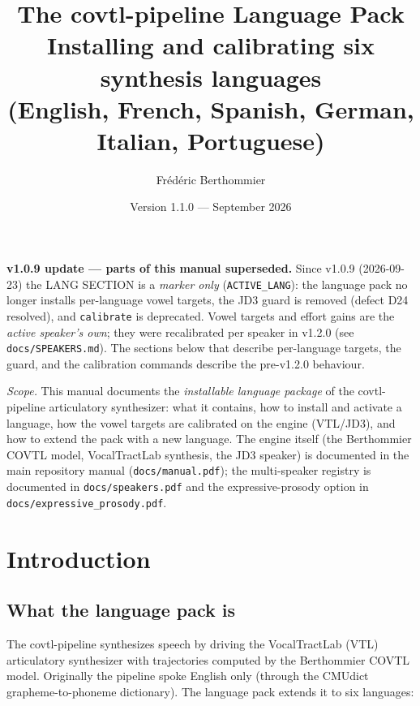 \documentclass[11pt,a4paper]{article}
\title{\textbf{The covtl-pipeline Language Pack}\\[0.4em]
\large Installing and calibrating six synthesis languages\\
(English, French, Spanish, German, Italian, Portuguese)}
\author{Fr\'ed\'eric Berthommier}
\date{Version 1.1.0 --- September 2026}
\newcommand{\code}[1]{\texttt{#1}}
\begin{document}
\noindent\textbf{\color{red} v1.0.9 update --- parts of this manual superseded.} Since v1.0.9 (2026-09-23) the LANG SECTION is a \emph{marker only} (\code{ACTIVE\_LANG}): the language pack no longer installs per-language vowel targets, the JD3 guard is removed (defect D24 resolved), and \code{calibrate} is deprecated. Vowel targets and effort gains are the \emph{active speaker’s own}; they were recalibrated per speaker in v1.2.0 (see \code{docs/SPEAKERS.md}). The sections below that describe per-language targets, the guard, and the calibration commands describe the pre-v1.2.0 behaviour.


\maketitle

\begin{center}
\begin{minipage}{0.86\textwidth}
\small\emph{Scope.} This manual documents the \emph{installable
language package} of the covtl-pipeline articulatory synthesizer: what
it contains, how to install and activate a language, how the vowel
targets are calibrated on the engine (VTL/JD3), and how to extend the
pack with a new language. The engine itself (the Berthommier COVTL
model, VocalTractLab synthesis, the JD3 speaker) is documented in the
main repository manual (\code{docs/manual.pdf}); the
multi-speaker registry is documented in \code{docs/speakers.pdf} and
the expressive-prosody option in
\code{docs/expressive\_prosody.pdf}.
\end{minipage}
\end{center}

\vspace{0.5em}
\tableofcontents
\vspace{1em}

\section{Introduction}

\subsection{What the language pack is}

The covtl-pipeline synthesizes speech by driving the VocalTractLab
(VTL) articulatory synthesizer with trajectories computed by the
Berthommier COVTL model. Originally the pipeline spoke English only
(through the CMUdict grapheme-to-phoneme dictionary). The language
pack extends it to six languages:
\end{document}
